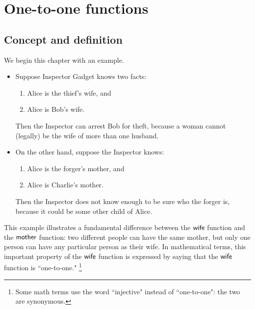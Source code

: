 \section{One-to-one functions}

\subsection{Concept and definition}

\medskip\noindent
We begin this chapter with an example.

\begin{example}{} 
\begin{itemize}
\item Suppose Inspector Gadget knows two facts:
\begin{enumerate}
\item Alice is the thief's wife,
and
\item Alice is Bob's wife.
\end{enumerate}
Then the Inspector can arrest Bob for theft,
because a woman cannot (legally) be the wife of more than one husband.

\item On the other hand, suppose the Inspector knows:
\begin{enumerate}
\item Alice is the forger's mother,
and
\item Alice is Charlie's mother.
\end{enumerate}
Then the Inspector does not know enough to be sure who the forger is,
because it could be some other child of Alice.
\end{itemize}
This example illustrates a fundamental difference between the $\sf{wife}$ function and the $\sf{mother}$ function: two different people can have the same mother, but only one person can have any particular person as their wife. 
In mathematical terms, this important property of the $\sf{wife}$ function is expressed by saying that the $\sf{wife}$ function is ``one-to-one."
\footnote{Some math terms use the word ``injective" instead of ``one-to-one": the two are synonymous.}
\end{example}

